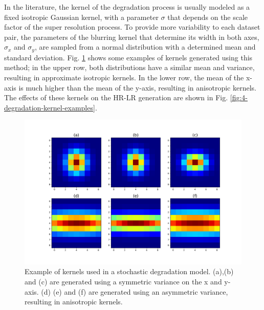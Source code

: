         In the literature, the kernel of the degradation process is usually modeled as a fixed isotropic Gaussian kernel, with a parameter $\sigma$ that depends on the scale factor of the super resolution process.
        To provide more variability to each dataset pair, the parameters of the blurring kernel that determine its width in both axes, $\sigma_x$ and $\sigma_y$, are sampled from a normal distribution with a determined mean and standard deviation. Fig. \ref{fig:4-degradation_kernels} shows some examples of kernels generated using this method; in the upper row, both distributions have a similar mean and variance, resulting in approximate isotropic kernels. In the lower row, the mean of the x-axis is much higher than the mean of the y-axis, resulting in anisotropic kernels. The effects of these kernels on the HR-LR generation are shown in Fig. \ref{fig:4-degradation-kernel-examples}.



        \begin{figure}[H]
                \centering
                \includegraphics[width=\linewidth]{Includes/4-degradation_kernels.pdf}
                \caption{Example of kernels used in a stochastic degradation model. (a),(b) and (c) are generated using a symmetric variance on the x and y-axis. (d) (e) and (f) are generated using an asymmetric variance, resulting in anisotropic kernels.}
                \label{fig:4-degradation_kernels}
            \end{figure}

